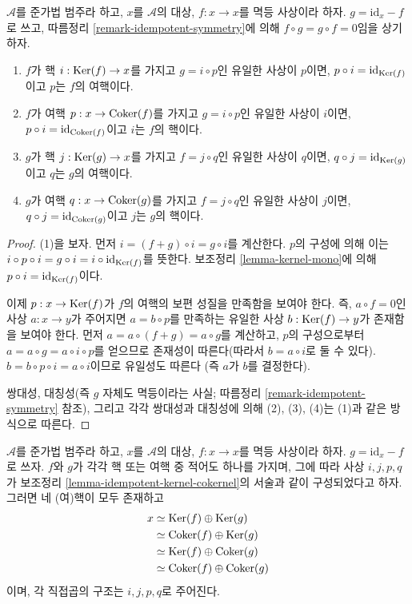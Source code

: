 \begin{lemma}
\label{lemma-idempotent-kernel-cokernel}
$\mathcal{A}$를 준가법 범주라 하고, $x$를 $\mathcal{A}$의 대상,
$f : x \to x$를 멱등 사상이라 하자.
$g = \text{id} _ x - f$로 쓰고, 따름정리
\ref{remark-idempotent-symmetry}에 의해 $f \circ g = g \circ f = 0$임을
상기하자.
\begin{enumerate}
\item $f$가 핵 $i : \mathop{\mathrm{Ker}} (f) \to x$를 가지고
$g = i \circ p$인 유일한 사상이 $p$이면,
$p \circ i = \text{id} _ {\mathop{\mathrm{Ker}} (f)}$이고 $p$는 $f$의 여핵이다.
\item $f$가 여핵 $p : x \to \mathop{\mathrm{Coker}} (f)$를 가지고
$g = i \circ p$인 유일한 사상이 $i$이면,
$p \circ i = \text{id} _ {\mathop{\mathrm{Coker}} (f)}$이고 $i$는 $f$의 핵이다.
\item $g$가 핵 $j : \mathop{\mathrm{Ker}} (g) \to x$를 가지고
$f = j \circ q$인 유일한 사상이 $q$이면,
$q \circ j = \text{id} _ {\mathop{\mathrm{Ker}} (g)}$이고 $q$는 $g$의 여핵이다.
\item $g$가 여핵 $q : x \to \mathop{\mathrm{Coker}} (g)$를 가지고
$f = j \circ q$인 유일한 사상이 $j$이면,
$q \circ j = \text{id} _ {\mathop{\mathrm{Coker}} (g)}$이고 $j$는 $g$의 핵이다.
\end{enumerate}
\end{lemma}

\begin{proof}
(1)을 보자. 먼저 $i = (f + g) \circ i = g \circ i$를 계산한다.
$p$의 구성에 의해 이는
$i \circ p \circ i = g \circ i = i \circ \text{id} _ {\mathop{\mathrm{Ker}} (f)}$를
뜻한다. 보조정리 \ref{lemma-kernel-mono}에 의해
$p \circ i = \text{id} _ {\mathop{\mathrm{Ker}} (f)}$이다.

\medskip\noindent
이제 $p : x \to \mathop{\mathrm{Ker}} (f)$가 $f$의 여핵의 보편 성질을 만족함을 보여야 한다.
즉, $a \circ f = 0$인 사상 $a : x \to y$가 주어지면
$a = b \circ p$를 만족하는 유일한 사상 $b : \mathop{\mathrm{Ker}} (f) \to y$가 존재함을
보여야 한다. 먼저 $a = a \circ (f + g) = a \circ g$를 계산하고, $p$의
구성으로부터 $a = a \circ g = a \circ i \circ p$를 얻으므로 존재성이
따른다(따라서 $b = a \circ i$로 둘 수 있다).
$b = b \circ p \circ i = a \circ i$이므로 유일성도 따른다
(즉 $a$가 $b$를 결정한다).

\medskip\noindent
쌍대성, 대칭성(즉 $g$ 자체도 멱등이라는 사실; 따름정리
\ref{remark-idempotent-symmetry} 참조), 그리고 각각 쌍대성과 대칭성에 의해
(2), (3), (4)는 (1)과 같은 방식으로 따른다.
\end{proof}

\begin{lemma}
\label{lemma-idempotent-splitting}
$\mathcal{A}$를 준가법 범주라 하고, $x$를 $\mathcal{A}$의 대상,
$f : x \to x$를 멱등 사상이라 하자.
$g = \text{id} _ x - f$로 쓰자. $f$와 $g$가 각각 핵 또는 여핵 중 적어도
하나를 가지며, 그에 따라 사상 $i , j , p , q$가 보조정리
\ref{lemma-idempotent-kernel-cokernel}의 서술과 같이 구성되었다고 하자.
그러면 네 (여)핵이 모두 존재하고
\begin{align*}
x
& \simeq \mathop{\mathrm{Ker}} (f) \oplus \mathop{\mathrm{Ker}} (g) \\
& \simeq \mathop{\mathrm{Coker}} (f) \oplus \mathop{\mathrm{Ker}} (g) \\
& \simeq \mathop{\mathrm{Ker}} (f) \oplus \mathop{\mathrm{Coker}} (g) \\
& \simeq \mathop{\mathrm{Coker}} (f) \oplus \mathop{\mathrm{Coker}} (g)
\end{align*}
이며, 각 직접곱의 구조는 $i , j , p , q$로 주어진다.
\end{lemma}

